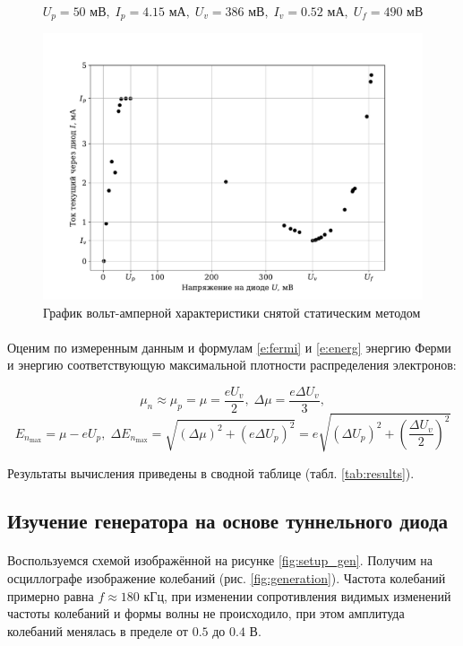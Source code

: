 \documentclass[a4paper,12pt]{article} %
\begin{document}
	\[ U_p = 50 \text{ мВ}, \; I_p = 4.15 \text{ мА}, \; U_v = 386 \text{ мВ}, \; I_v = 0.52 \text{ мА}, \; U_f = 490 \text{ мВ} \]
	
	
\begin{figure}[h]
\centering
\includegraphics[width=\textwidth]{plot.pdf}
\caption{График вольт-амперной характеристики снятой статическим методом}
\label{fig:plot}
\end{figure}

\paragraph{} Оценим по измеренным данным и формулам \eqref{e:fermi} и \eqref{e:energ} энергию Ферми и энергию соответствующую максимальной плотности распределения электронов:

\[
\mu_n \approx \mu_p = \mu = \frac{eU_v}{2}, \; \Delta \mu = \frac{e \Delta U_v}{3},
\]\[ 
E_{n_{\max}} = \mu - eU_p, \; \Delta E_{n_{\max}} = \sqrt{(\Delta \mu)^2 + (e \Delta U_p)^2} = e \sqrt{(\Delta U_p)^2 + \left(\frac{\Delta U_v}{2}\right)^2}
\]
	
\noindent Результаты вычисления приведены в сводной таблице (табл. \ref{tab:results}). 
	
\subsection{Изучение генератора на основе туннельного диода}

\paragraph{}
	Воспользуемся схемой изображённой на рисунке \ref{fig:setup_gen}. Получим на осциллографе изображение колебаний (рис. \ref{fig:generation}). Частота колебаний примерно равна $f \approx 180$ кГц, при изменении сопротивления видимых изменений частоты колебаний и формы волны не происходило, при этом амплитуда колебаний менялась в пределе от $0.5$ до $0.4$ В.
\end{document}
